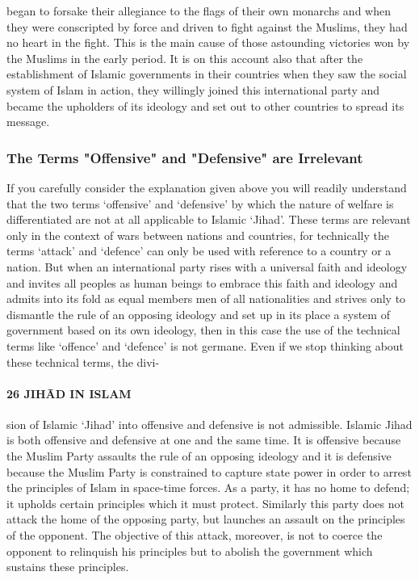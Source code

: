 began to forsake their allegiance to the flags of their own monarchs and
when they were conscripted by force and driven to fight against the
Muslims, they had no heart in the fight. This is the main cause of those
astounding victories won by the Muslims in the early period. It is on
this account also that after the establishment of Islamic governments in
their countries when they saw the social system of Islam in action, they
willingly joined this international party and became the upholders of
its ideology and set out to other countries to spread its message.

\hypertarget{the-terms-offensive-and-defensive-are-irrelevant}{%
\subsubsection{The Terms "Offensive" and "Defensive" are
Irrelevant}\label{the-terms-offensive-and-defensive-are-irrelevant}}

If you carefully consider the explanation given above you will readily
understand that the two terms `offensive' and `defensive' by which the
nature of welfare is differentiated are not at all applicable to Islamic
`Jihad'. These terms are relevant only in the context of wars between
nations and countries, for technically the terms `attack' and `defence'
can only be used with reference to a country or a nation. But when an
international party rises with a universal faith and ideology and
invites all peoples as human beings to embrace this faith and ideology
and admits into its fold as equal members men of all nationalities and
strives only to dismantle the rule of an opposing ideology and set up in
its place a system of government based on its own ideology, then in this
case the use of the technical terms like `offence' and `defence' is not
germane. Even if we stop thinking about these technical terms, the divi-

\hypertarget{jihux101d-in-islam-1}{%
\paragraph{26 JIHĀD IN ISLAM}\label{jihux101d-in-islam-1}}

sion of Islamic `Jihad' into offensive and defensive is not admissible.
Islamic Jihad is both offensive and defensive at one and the same time.
It is offensive because the Muslim Party assaults the rule of an
opposing ideology and it is defensive because the Muslim Party is
constrained to capture state power in order to arrest the principles of
Islam in space-time forces. As a party, it has no home to defend; it
upholds certain principles which it must protect. Similarly this party
does not attack the home of the opposing party, but launches an assault
on the principles of the opponent. The objective of this attack,
moreover, is not to coerce the opponent to relinquish his principles but
to abolish the government which sustains these principles.

